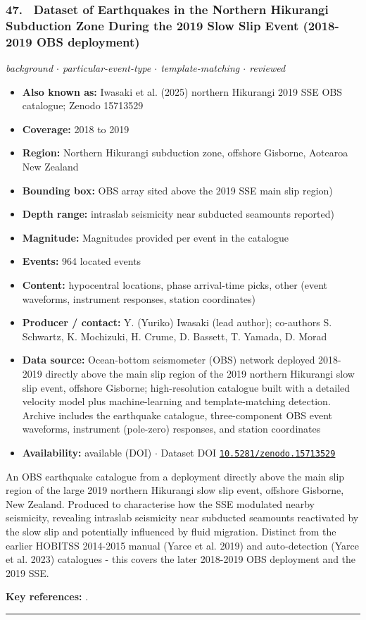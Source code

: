 \documentclass[10pt,a4paper]{article}
\newcommand{\catentryrule}{\par\vspace{3pt}\noindent\textcolor{rulegrey}{\rule{\linewidth}{0.3pt}}\par\vspace{5pt}}
\newcommand{\kv}[2]{\item \textbf{#1:} #2}
\begin{document}
\subsubsection*{\hypertarget{c:47}{47.}~ Dataset of Earthquakes in the Northern Hikurangi Subduction Zone During the 2019 Slow Slip Event (2018-2019 OBS deployment)}
{\small\itshape background $\cdot$ particular-event-type $\cdot$ template-matching $\cdot$ reviewed}\par\vspace{2pt}
\begin{itemize}[leftmargin=1.3em,itemsep=0.6pt,topsep=1pt,parsep=0pt]
\kv{Also known as}{Iwasaki et al. (2025) northern Hikurangi 2019 SSE OBS catalogue; Zenodo 15713529}
\kv{Coverage}{2018 to 2019}
\kv{Region}{Northern Hikurangi subduction zone, offshore Gisborne, Aotearoa New Zealand}
\kv{Bounding box}{OBS array sited above the 2019 SSE main slip region)}
\kv{Depth range}{intraslab seismicity near subducted seamounts reported)}
\kv{Magnitude}{Magnitudes provided per event in the catalogue}
\kv{Events}{964 located events}
\kv{Content}{hypocentral locations, phase arrival-time picks, other (event waveforms, instrument responses, station coordinates)}
\kv{Producer / contact}{Y. (Yuriko) Iwasaki (lead author); co-authors S. Schwartz, K. Mochizuki, H. Crume, D. Bassett, T. Yamada, D. Morad}
\kv{Data source}{Ocean-bottom seismometer (OBS) network deployed 2018-2019 directly above the main slip region of the 2019 northern Hikurangi slow slip event, offshore Gisborne; high-resolution catalogue built with a detailed velocity model plus machine-learning and template-matching detection. Archive includes the earthquake catalogue, three-component OBS event waveforms, instrument (pole-zero) responses, and station coordinates}
\kv{Availability}{available (DOI) $\cdot$ Dataset DOI \href{https://doi.org/10.5281/zenodo.15713529}{\nolinkurl{10.5281/zenodo.15713529}}}
\end{itemize}
\par\vspace{2pt}An OBS earthquake catalogue from a deployment directly above the main slip region of the large 2019 northern Hikurangi slow slip event, offshore Gisborne, New Zealand. Produced to characterise how the SSE modulated nearby seismicity, revealing intraslab seismicity near subducted seamounts reactivated by the slow slip and potentially influenced by fluid migration. Distinct from the earlier HOBITSS 2014-2015 manual (Yarce et al. 2019) and auto-detection (Yarce et al. 2023) catalogues - this covers the later 2018-2019 OBS deployment and the 2019 SSE.
\par\vspace{2pt}\textbf{Key references:} \cite{Iwasaki2025,Iwasaki2025a}.
\catentryrule
\end{document}
